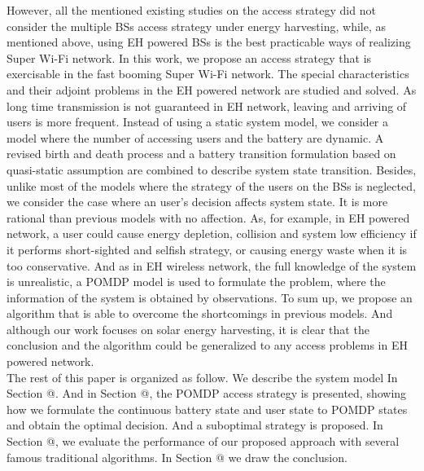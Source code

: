 \documentclass[conference]{IEEEtran}
\makeatletter
\newcommand{\Rmnum}[1]{\expandafter\@slowromancap\romannumeral #1@}
\makeatother
\begin{document}
\indent However, all the mentioned existing studies on the access strategy did not consider the 
multiple BSs access strategy under energy harvesting, while, as mentioned above,
using EH powered BSs is the best practicable ways of realizing Super Wi-Fi network.
In this work, we propose an access strategy that is exercisable in the fast booming Super Wi-Fi network.
The special characteristics and their adjoint problems in the EH powered network are studied and solved.
As long time transmission is not guaranteed in EH network,
leaving and arriving of users is more frequent.
Instead of using a static system model,
we consider a model where the number of accessing users and the battery are dynamic.
A revised birth and death process and a battery transition formulation based on quasi-static assumption
are combined to describe system state transition.
Besides, unlike most of the models where the strategy of the users on the BSs is neglected,
we consider the case where an user's decision affects system state.
It is more rational than previous models with no affection.
As, for example, in EH powered network, a user could cause energy depletion,
collision and system low efficiency if it performs short-sighted and selfish strategy,
or causing energy waste when it is too conservative.
And as in EH wireless network, the full knowledge of the system is unrealistic,
a POMDP model is used to formulate the problem, where the information of the system is obtained by observations.
To sum up, we propose an algorithm that is able to overcome the shortcomings in previous models.
And although our work focuses on solar energy harvesting,
it is clear that the conclusion and the algorithm could be generalized to any access problems in EH powered network.
\\
\indent The rest of this paper is organized as follow.
We describe the system model In Section \Rmnum{2}.
And in Section \Rmnum{3}, the POMDP access strategy is presented,
showing how we formulate the continuous battery state and user state to
POMDP states and obtain the optimal decision. And a suboptimal strategy is proposed.
In Section \Rmnum{4}, we evaluate the performance of our proposed approach with several famous traditional algorithms.
In Section \Rmnum{5} we draw the conclusion.
\end{document}
